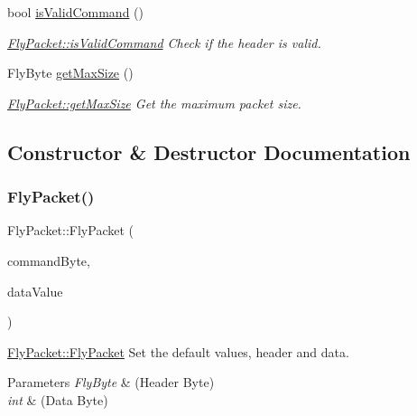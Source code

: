 \begin{DoxyCompactItemize}
bool \hyperlink{class_fly_packet_a32bdd283c8d5961adb20524a14269224}{is\+Valid\+Command} ()
\begin{DoxyCompactList}\small\item\em \hyperlink{class_fly_packet_a32bdd283c8d5961adb20524a14269224}{Fly\+Packet\+::is\+Valid\+Command} Check if the header is valid. \end{DoxyCompactList}\item 
Fly\+Byte \hyperlink{class_fly_packet_ad8406536002965db603f5c9f03906794}{get\+Max\+Size} ()
\begin{DoxyCompactList}\small\item\em \hyperlink{class_fly_packet_ad8406536002965db603f5c9f03906794}{Fly\+Packet\+::get\+Max\+Size} Get the maximum packet size. \end{DoxyCompactList}\end{DoxyCompactItemize}


\subsection{Constructor \& Destructor Documentation}
\hypertarget{class_fly_packet_ac6a9ad5c29755d32ae52bb3526563d79}{}\label{class_fly_packet_ac6a9ad5c29755d32ae52bb3526563d79} 
\subsubsection{\texorpdfstring{Fly\+Packet()}{FlyPacket()}\hspace{0.1cm}{\footnotesize\ttfamily [1/2]}}
{\footnotesize\ttfamily Fly\+Packet\+::\+Fly\+Packet (\begin{DoxyParamCaption}\item[{Fly\+Byte}]{command\+Byte,  }\item[{int}]{data\+Value }\end{DoxyParamCaption})}



\hyperlink{class_fly_packet_aca19954f7e01d839b5759245a9950d57}{Fly\+Packet\+::\+Fly\+Packet} Set the default values, header and data. 


\begin{DoxyParams}{Parameters}
{\em Fly\+Byte} & (Header Byte) \\
\hline
{\em int} & (Data Byte) \\
\hline
\end{DoxyParams}
\hypertarget{class_fly_packet_a24c7957a841f24405f26ceb918e15a04}{}\label{class_fly_packet_a24c7957a841f24405f26ceb918e15a04} 
